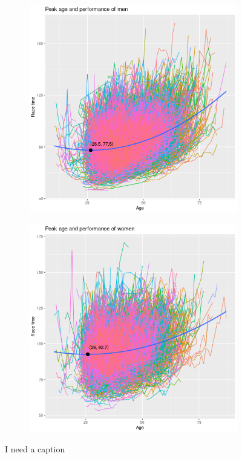 \documentclass[12pt]{article}
\begin{document}
\begin{figure}
	\centering
	\begin{subfigure}{0.49\textwidth}
		\includegraphics[width = \textwidth]
		{../figure/peak_plot2-1.png}
		\caption{}
		\label{peak-men}
	\end{subfigure}
	\hfill
	\begin{subfigure}{0.49\textwidth}
		\includegraphics[width = \textwidth]
		{../figure/peak_plot2-2.png}
		\caption{}
		\label{peak-women}
	\end{subfigure}
	\caption{I need a caption}
	\label{peak}
\end{figure}
\end{document}
